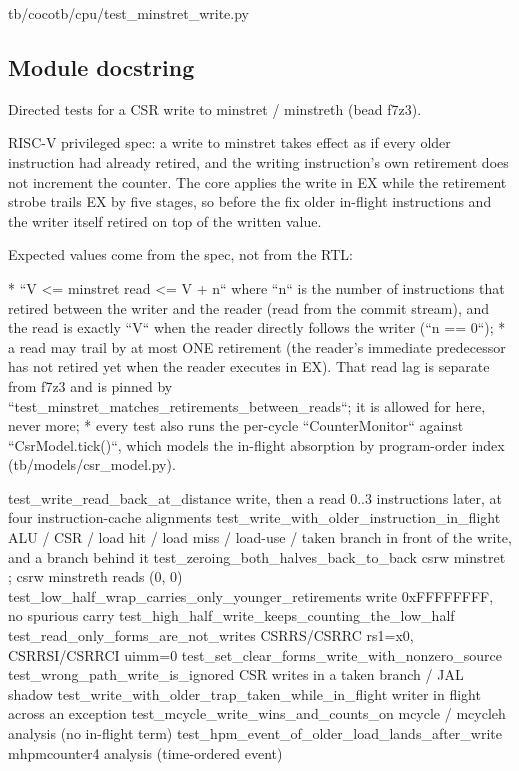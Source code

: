 \begin{relocated}{tb/cocotb/cpu/test_minstret_write.py}

\subsection*{Module docstring}

\begin{textblock}
Directed tests for a CSR write to minstret / minstreth (bead f7z3).

RISC-V privileged spec: a write to minstret takes effect as if every older instruction had
already retired, and the writing instruction's own retirement does not increment the counter.  The
core applies the write in EX while the retirement strobe trails EX by five stages, so before the
fix older in-flight instructions and the writer itself retired on top of the written value.

Expected values come from the spec, not from the RTL:

* ``V <= minstret read <= V + n`` where ``n`` is the number of instructions that retired between
the writer and the reader (read from the commit stream), and the read is exactly ``V`` when the
reader directly follows the writer (``n == 0``);
* a read may trail by at most ONE retirement (the reader's immediate predecessor has not
retired yet when the reader executes in EX).  That read lag is separate from f7z3 and is pinned
by ``test_minstret_matches_retirements_between_reads``; it is allowed for here, never more;
* every test also runs the per-cycle ``CounterMonitor`` against ``CsrModel.tick()``, which models
the in-flight absorption by program-order index (tb/models/csr_model.py).

test_write_read_back_at_distance          write, then a read 0..3 instructions later, at four
instruction-cache alignments
test_write_with_older_instruction_in_flight  ALU / CSR / load hit / load miss / load-use / taken
branch in front of the write, and a branch behind it
test_zeroing_both_halves_back_to_back     csrw minstret ; csrw minstreth reads (0, 0)
test_low_half_wrap_carries_only_younger_retirements   write 0xFFFFFFFF, no spurious carry
test_high_half_write_keeps_counting_the_low_half
test_read_only_forms_are_not_writes       CSRRS/CSRRC rs1=x0, CSRRSI/CSRRCI uimm=0
test_set_clear_forms_write_with_nonzero_source
test_wrong_path_write_is_ignored          CSR writes in a taken branch / JAL shadow
test_write_with_older_trap_taken_while_in_flight   writer in flight across an exception
test_mcycle_write_wins_and_counts_on      mcycle / mcycleh analysis (no in-flight term)
test_hpm_event_of_older_load_lands_after_write   mhpmcounter4 analysis (time-ordered event)
\end{textblock}

\end{relocated}

